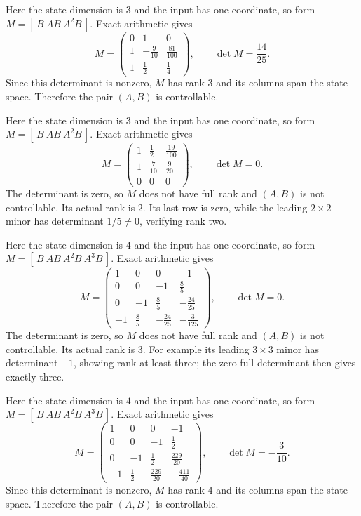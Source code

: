 Here the state dimension is $3$ and the input has one coordinate, so form $M=[\,B\ AB\ A^2B\,]$. Exact arithmetic gives
\[ M=\begin{pmatrix}0&1&0\\1&- \frac{9}{10}&\frac{81}{100}\\1&\frac{1}{2}&\frac{1}{4}\end{pmatrix},\qquad\det M=\frac{14}{25}.\]
Since this determinant is nonzero, $M$ has rank $3$ and its columns span the state space. Therefore the pair $(A,B)$ is controllable.

Here the state dimension is $3$ and the input has one coordinate, so form $M=[\,B\ AB\ A^2B\,]$. Exact arithmetic gives
\[ M=\begin{pmatrix}1&\frac{1}{2}&\frac{19}{100}\\1&\frac{7}{10}&\frac{9}{20}\\0&0&0\end{pmatrix},\qquad\det M=0.\]
The determinant is zero, so $M$ does not have full rank and $(A,B)$ is not controllable. Its actual rank is $2$. Its last row is zero, while the leading $2\times2$ minor has determinant $1/5\ne0$, verifying rank two.

Here the state dimension is $4$ and the input has one coordinate, so form $M=[\,B\ AB\ A^2B\ A^3B\,]$. Exact arithmetic gives
\[ M=\begin{pmatrix}1&0&0&-1\\0&0&-1&\frac{8}{5}\\0&-1&\frac{8}{5}&- \frac{24}{25}\\-1&\frac{8}{5}&- \frac{24}{25}&- \frac{3}{125}\end{pmatrix},\qquad\det M=0.\]
The determinant is zero, so $M$ does not have full rank and $(A,B)$ is not controllable. Its actual rank is $3$. For example its leading $3\times3$ minor has determinant $-1$, showing rank at least three; the zero full determinant then gives exactly three.

Here the state dimension is $4$ and the input has one coordinate, so form $M=[\,B\ AB\ A^2B\ A^3B\,]$. Exact arithmetic gives
\[ M=\begin{pmatrix}1&0&0&-1\\0&0&-1&\frac{1}{2}\\0&-1&\frac{1}{2}&\frac{229}{20}\\-1&\frac{1}{2}&\frac{229}{20}&- \frac{411}{40}\end{pmatrix},\qquad\det M=- \frac{3}{10}.\]
Since this determinant is nonzero, $M$ has rank $4$ and its columns span the state space. Therefore the pair $(A,B)$ is controllable.
